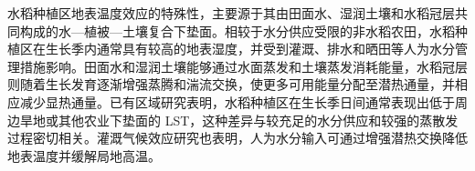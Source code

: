 水稻种植区地表温度效应的特殊性，主要源于其由田面水、湿润土壤和水稻冠层共同构成的水—植被—土壤复合下垫面。相较于水分供应受限的非水稻农田，水稻种植区在生长季内通常具有较高的地表湿度，并受到灌溉、排水和晒田等人为水分管理措施影响。田面水和湿润土壤能够通过水面蒸发和土壤蒸发消耗能量，水稻冠层则随着生长发育逐渐增强蒸腾和湍流交换，使更多可用能量分配至潜热通量，并相应减少显热通量。已有区域研究表明，水稻种植区在生长季日间通常表现出低于周边旱地或其他农业下垫面的 LST，这种差异与较充足的水分供应和较强的蒸散发过程密切相关\cite{Xue2021RemoteSensing,Liu2022AgForMet}。灌溉气候效应研究也表明，人为水分输入可通过增强潜热交换降低地表温度并缓解局地高温\cite{Thiery2020Irrigation}。





